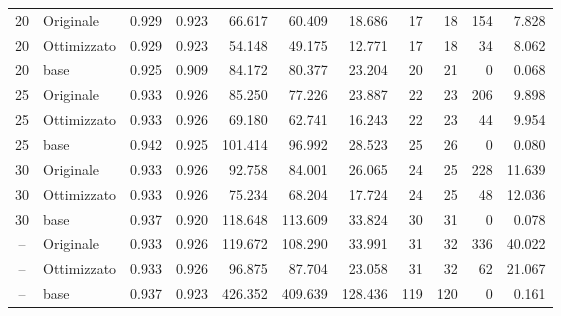\documentclass{article}
\begin{document}
\begin{table}[htbp]
\begin{tabular}{c l r r r r r r r r r}
\midrule
20 & Originale   & 0.929 & 0.923 & 66.617 & 60.409 & 18.686 & 17 & 18 & 154 & 7.828 \\
20 & Ottimizzato & 0.929 & 0.923 & 54.148 & 49.175 & 12.771 & 17 & 18 & 34 & 8.062 \\
20 & base        & 0.925 & 0.909 & 84.172 & 80.377 & 23.204 & 20 & 21 & 0 & 0.068 \\
\midrule
25 & Originale   & 0.933 & 0.926 & 85.250 & 77.226 & 23.887 & 22 & 23 & 206 & 9.898 \\
25 & Ottimizzato & 0.933 & 0.926 & 69.180 & 62.741 & 16.243 & 22 & 23 & 44 & 9.954 \\
25 & base        & 0.942 & 0.925 & 101.414 & 96.992 & 28.523 & 25 & 26 & 0 & 0.080 \\
\midrule
30 & Originale   & 0.933 & 0.926 & 92.758 & 84.001 & 26.065 & 24 & 25 & 228 & 11.639 \\
30 & Ottimizzato & 0.933 & 0.926 & 75.234 & 68.204 & 17.724 & 24 & 25 & 48 & 12.036 \\
30 & base        & 0.937 & 0.920 & 118.648 & 113.609 & 33.824 & 30 & 31 & 0 & 0.078 \\
\midrule
-- & Originale   & 0.933 & 0.926 & 119.672 & 108.290 & 33.991 & 31 & 32 & 336 & 40.022 \\
-- & Ottimizzato & 0.933 & 0.926 & 96.875 & 87.704 & 23.058 & 31 & 32 & 62 & 21.067 \\
-- & base        & 0.937 & 0.923 & 426.352 & 409.639 & 128.436 & 119 & 120 & 0 & 0.161 \\
\bottomrule
\end{tabular}
\end{table}
\end{document}
